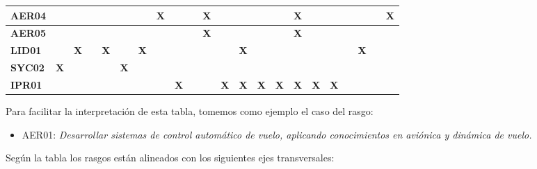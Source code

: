 \begin{center}
\begin{adjustbox}{max width=\textwidth,max totalheight=.82\textheight}
\begin{tabular}{|l|c|c|c|c|c|c|c|c|c|c|c|c|c|c|c|c|c|c|c|c|c|}
\rowcolor{azulClaro}
\textcolor{azulTEC}{\textbf{AER04}} & \textbf{ } & \textbf{ } & \textbf{ } & \textbf{ } & \textbf{ } & \textbf{ } & \textbf{X} & \textbf{ } & \textbf{ } & \textbf{X} & \textbf{ } & \textbf{ } & \textbf{ } & \textbf{ } & \textbf{X} & \textbf{ } & \textbf{ } & \textbf{ } & \textbf{ } & \textbf{ } & \textbf{X} \\ \hline
\rowcolor{azulClaro}
\textcolor{azulTEC}{\textbf{AER05}} & \textbf{ } & \textbf{ } & \textbf{ } & \textbf{ } & \textbf{ } & \textbf{ } & \textbf{ } & \textbf{ } & \textbf{ } & \textbf{X} & \textbf{ } & \textbf{ } & \textbf{ } & \textbf{ } & \textbf{X} & \textbf{ } & \textbf{ } & \textbf{ } & \textbf{ } & \textbf{ } & \textbf{ } \\ \hline
\rowcolor{azulClaro}
\textcolor{azulTEC}{\textbf{LID01}} & \textbf{ } & \textbf{X} & \textbf{ } & \textbf{X} & \textbf{ } & \textbf{X} & \textbf{ } & \textbf{ } & \textbf{ } & \textbf{ } & \textbf{ } & \textbf{X} & \textbf{ } & \textbf{ } & \textbf{ } & \textbf{ } & \textbf{ } & \textbf{ } & \textbf{X} & \textbf{ } & \textbf{ } \\ \hline
\rowcolor{azulClaro}
\textcolor{azulTEC}{\textbf{SYC02}} & \textbf{X} & \textbf{ } & \textbf{ } & \textbf{ } & \textbf{X} & \textbf{ } & \textbf{ } & \textbf{ } & \textbf{ } & \textbf{ } & \textbf{ } & \textbf{ } & \textbf{ } & \textbf{ } & \textbf{ } & \textbf{ } & \textbf{ } & \textbf{ } & \textbf{ } & \textbf{ } & \textbf{ } \\ \hline
\rowcolor{azulClaro}
\textcolor{azulTEC}{\textbf{IPR01}} & \textbf{ } & \textbf{ } & \textbf{ } & \textbf{ } & \textbf{ } & \textbf{ } & \textbf{ } & \textbf{X} & \textbf{ } & \textbf{ } & \textbf{X} & \textbf{X} & \textbf{X} & \textbf{X} & \textbf{X} & \textbf{X} & \textbf{X} & \textbf{ } & \textbf{ } & \textbf{ } & \textbf{ } \\ \hline
\end{tabular}
\end{adjustbox}
\end{center}

Para facilitar la interpretación de esta tabla, tomemos como ejemplo el caso del rasgo:\par

\begin{itemize}
\item AER01: \textit{Desarrollar sistemas de control automático de vuelo, aplicando conocimientos en aviónica y dinámica de vuelo.}
\end{itemize}
Según la tabla los rasgos están alineados con los siguientes ejes transversales:\par

